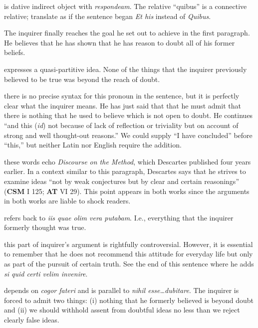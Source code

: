  is dative indirect object with \textit{respondeam}. The relative ``quibus'' is a connective relative; translate as if the sentence began \textit{Et his} instead of \textit{Quibus}.

 The inquirer finally reaches the goal he set out to achieve in the first paragraph. He believes that he has shown that he has reason to doubt all of his former beliefs.

 expresses a quasi-partitive idea. None of the things that the inquirer previously believed to be true was beyond the reach of doubt.

 there is no precise syntax for this pronoun in the sentence, but it is perfectly clear what the inquirer means. He has just said that that he must admit that there is nothing that he used to believe which is not open to doubt. He continues ``and this (\textit{id}) not because of lack of reflection or triviality but on account of strong and well thought-out reasons.'' We could supply ``I have concluded'' before ``this,'' but neither Latin nor English require the addition.

 these words echo \textit{Discourse on the Method}, which Descartes published four years earlier. In a context similar to this paragraph, Descartes says that he strives to examine ideas ``not by weak conjectures but by clear and certain reasonings'' (\textbf{CSM} I 125; \textbf{AT} VI 29). This point appears in both works since the arguments in both works are liable to shock readers.

 refers back to \textit{iis quae olim vera putabam}. I.e., everything that the inquirer formerly thought was true.

 this part of inquirer's argument is rightfully controversial. However, it is essential to remember that he does not recommend this attitude for everyday life but only as part of the pursuit of certain truth. See the end of this sentence where he adds \textit{si quid certi velim invenire}.

 depends on \textit{cogor fateri} and is parallel to \textit{nihil esse\dots dubitare}. The inquirer is forced to admit two things: (i) nothing that he formerly believed is beyond doubt and (ii) we should withhold assent from doubtful ideas no less than we reject clearly false ideas.

